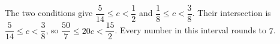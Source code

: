 The two conditions give $\dfrac{5}{14}\le c<\dfrac{1}{2}$ and $\dfrac{1}{8}\le c<\dfrac{3}{8}$. Their intersection is $\dfrac{5}{14}\le c<\dfrac{3}{8}$, so $\dfrac{50}{7}\le20c<\dfrac{15}{2}$. Every number in this interval rounds to $\boxed7$.
